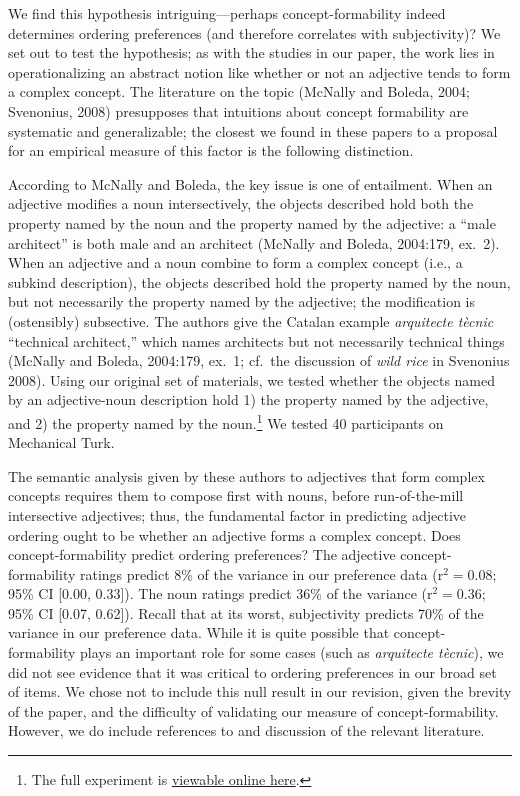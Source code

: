 \documentclass[12pt]{article}
\begin{document}
We find this hypothesis intriguing---perhaps concept-formability indeed determines ordering preferences (and therefore correlates with subjectivity)?
We set out to test the hypothesis; as with the studies in our paper, the work lies in operationalizing an abstract notion like whether or not an adjective tends to form a complex concept. The literature on the topic (McNally and Boleda, 2004; Svenonius, 2008) presupposes that intuitions about concept formability are systematic and generalizable; the closest we found in these papers to a proposal for an empirical measure of this factor is the following distinction.

According to McNally and Boleda, the key issue is one of entailment. When an adjective modifies a noun intersectively, the objects described hold both the property named by the noun and the property named by the adjective: a ``male architect'' is both male and an architect (McNally and Boleda, 2004:179, ex.~2). When an adjective and a noun combine to form a complex concept (i.e., a subkind description), the objects described hold the property named by the noun, but not necessarily the property named by the adjective; the modification is (ostensibly) subsective. The authors give the Catalan example \emph{arquitecte t\`{e}cnic} ``technical architect,'' which names architects but not necessarily technical things (McNally and Boleda, 2004:179, ex.~1; cf.~the discussion of \emph{wild rice} in Svenonius 2008). 
Using our original set of materials, we tested whether the objects named by an adjective-noun description hold 1) the property named by the adjective, and 2) the property named by the noun.\footnote{The full experiment is \href{http://web.stanford.edu/~scontras/adjective_ordering/experiments/9-concept-formability/concept-formability.html}{viewable online here}.} We tested 40 participants on Mechanical Turk. 


The semantic analysis given by these authors to adjectives that form complex concepts requires them to compose first with nouns, before run-of-the-mill intersective adjectives; thus, the fundamental factor in predicting adjective ordering ought to be whether an adjective forms a complex concept. Does concept-formability predict ordering preferences?
The adjective concept-formability ratings predict 8\% of the variance in our preference data (r$^{2}=0.08$; 95\% CI [0.00,  0.33]). The noun ratings predict 36\% of the variance (r$^{2}=0.36$; 95\% CI [0.07,  0.62]). Recall that at its worst, subjectivity predicts 70\% of the variance in our preference data.
While it is quite possible that concept-formability plays an important role for some cases (such as \emph{arquitecte t\`{e}cnic}), we did not see evidence that it was critical to ordering preferences in our broad set of items. We chose not to include this null result in our revision, given the brevity of the paper, and the difficulty of validating our measure of concept-formability. 
However, we do include references to and discussion of the relevant literature. 
\end{document}

